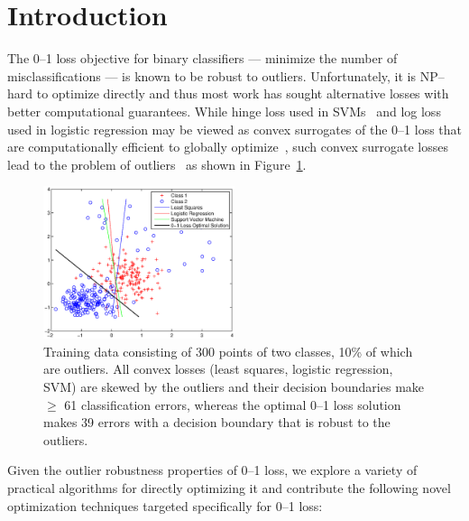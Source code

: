 \section{Introduction}
\label{cha:intro}

The 0--1 loss objective for binary classifiers --- minimize the number
of misclassifications --- is known to be robust to outliers.
Unfortunately, it is NP--hard to optimize directly
\cite{Feldman,nphard} and thus most work has sought alternative losses
with better computational guarantees.  While hinge loss used in
SVMs~\cite{Vapnik} and log loss used in logistic regression may be
viewed as convex surrogates of the 0--1 loss that are computationally
efficient to globally optimize~\cite{Bartlett}, such convex surrogate
losses lead to the problem of outliers~\cite{wu07,outliers,Ding} as
shown in Figure~\ref{fig:svm_failure}.

\begin{figure}[t!]
\vspace{-4mm}
\hspace{-3mm} \includegraphics[width=0.50\textwidth]{images/fig11_svm_failure2.eps}
\vspace{-9mm}
\caption{ \footnotesize Training data consisting of 300 points of two
  classes, 10\% of which are outliers.  All convex losses (least
  squares, logistic regression, SVM) are skewed by the outliers and
  their decision boundaries make $\geq$ 61 classification errors,
  whereas the optimal 0--1 loss solution makes 39 errors with a decision
  boundary that is robust to the outliers.}
\label{fig:svm_failure}
\vspace{-4mm}
\end{figure}

Given the outlier robustness properties of 0--1 loss, we explore a
variety of practical algorithms for directly optimizing it and
contribute the following novel optimization techniques targeted
specifically for 0--1 loss:

